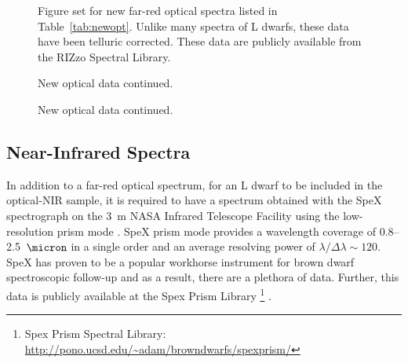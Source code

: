 \documentclass[12pt]{aastex6}
\begin{document}
\clearpage

\begin{figure}
  \caption{Figure set for new far-red optical spectra listed in Table~\ref{tab:newopt}. Unlike many spectra of L dwarfs, these data have been telluric corrected. These data are publicly available from the RIZzo Spectral Library.}
    \label{fig:newopt}
\end{figure}

\begin{figure}
    \caption{New optical data continued.}
\end{figure}

\begin{figure}
    \caption{New optical data continued.}
\end{figure}

\clearpage


\subsection{Near-Infrared Spectra}

In addition to a far-red optical spectrum, for an L dwarf to be included in the optical-NIR sample, it is required to have a spectrum obtained with the SpeX spectrograph on the 3~m NASA Infrared Telescope Facility using the low-resolution prism mode \citep{Spex}.
SpeX prism mode provides a wavelength coverage of 0.8--2.5~$\micron$ in a single order and an average resolving power of $\lambda/\Delta\lambda\sim120$.
SpeX has proven to be a popular workhorse instrument for brown dwarf spectroscopic follow-up and as a result, there are a plethora of data.
Further, this data is publicly available at the Spex Prism Library \footnote{Spex Prism Spectral Library: \url{http://pono.ucsd.edu/~adam/browndwarfs/spexprism/}} \citep{Burgasser:2014tr}.
\end{document}
